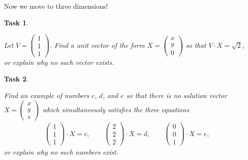 \documentclass[10pt,]{book}
\theoremstyle{plain}
\numberwithin{equation}{section}
\newtheorem{task}{Task}[chapter]
\begin{document}
Now we move to three dimensions!%
\begin{task}
\label{task-20}

        Let \(V = \left(\begin{smallmatrix}1\\1\\1\end{smallmatrix}\right)\).
        Find a unit vector of the form \(X = \left(\begin{smallmatrix}x\\y\\0
        \end{smallmatrix}\right)\) so that \(V\cdot X = \sqrt{2}\), or explain
        why no such vector exists.
      \end{task}
\begin{task}
\label{task-21}

        Find an example of numbers \(c\), \(d\), and \(e\) so that there
        is no solution vector \(X = \left(\begin{smallmatrix}x\\y\\z
        \end{smallmatrix}\right)\) which simultaneously satisfies the three
        equations \begin{gather*}
\begin{pmatrix} 1\\1\\1\end{pmatrix}\cdot X = c, \qquad
          \begin{pmatrix} 2\\2\\2\end{pmatrix}\cdot X = d, \qquad
          \begin{pmatrix} 0\\0\\1\end{pmatrix}\cdot X = e,
\end{gather*}
          or explain why no such numbers exist.
      \end{task}
\end{document}
